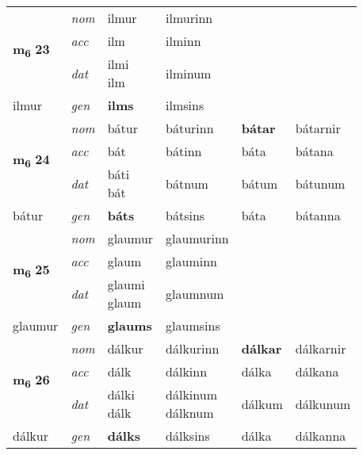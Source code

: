 \begin{longtable}[l]{llllll}
\multirow{3}{*}{{{\textbf{m{\textsubscript{6}}} \Large{\textbf{23}}}}}  & {\footnotesize{{\textit{nom}}}} & ilmur & ilmurinn    & \textbf{} &   \\*
 &  {\footnotesize{{\textit{acc}}}} & ilm  & ilminn   &   &  \\*
 &  {\footnotesize{{\textit{dat}}}} & \specialcell{ilmi\\ ilm} & ilminum   &  &  \\*
 {\footnotesize{ilmur}} &   {\footnotesize{{\textit{gen}}}} & \textbf{ilms}  & ilmsins  &  &  \\
\cmidrule{1-6}


\multirow{3}{*}{{{\textbf{m{\textsubscript{6}}} \Large{\textbf{24}}}}}  & {\footnotesize{{\textit{nom}}}} & bátur & báturinn    & \textbf{bátar} & bátarnir  \\*
 &  {\footnotesize{{\textit{acc}}}} & bát  & bátinn   & báta  & bátana \\*
 &  {\footnotesize{{\textit{dat}}}} & \specialcell{báti\\ bát} & bátnum   & bátum & bátunum \\*
 {\footnotesize{bátur}} &   {\footnotesize{{\textit{gen}}}} & \textbf{báts}  & bátsins  & báta & bátanna \\
\cmidrule{1-6}


\multirow{3}{*}{{{\textbf{m{\textsubscript{6}}} \Large{\textbf{25}}}}}  & {\footnotesize{{\textit{nom}}}} & glaumur & glaumurinn    & \textbf{} &   \\*
 &  {\footnotesize{{\textit{acc}}}} & glaum  & glauminn   &   &  \\*
 &  {\footnotesize{{\textit{dat}}}} & \specialcell{glaumi\\ glaum} & glaumnum   &  &  \\*
 {\footnotesize{glaumur}} &   {\footnotesize{{\textit{gen}}}} & \textbf{glaums}  & glaumsins  &  &  \\
\cmidrule{1-6}


\multirow{3}{*}{{{\textbf{m{\textsubscript{6}}} \Large{\textbf{26}}}}}  & {\footnotesize{{\textit{nom}}}} & dálkur & dálkurinn    & \textbf{dálkar} & dálkarnir  \\*
 &  {\footnotesize{{\textit{acc}}}} & dálk  & dálkinn   & dálka  & dálkana \\*
 &  {\footnotesize{{\textit{dat}}}} & \specialcell{dálki\\ dálk} & \specialcell{dálkinum\\ dálknum}   & dálkum & dálkunum \\*
 {\footnotesize{dálkur}} &   {\footnotesize{{\textit{gen}}}} & \textbf{dálks}  & dálksins  & dálka & dálkanna \\
\cmidrule{1-6}



\end{longtable}
